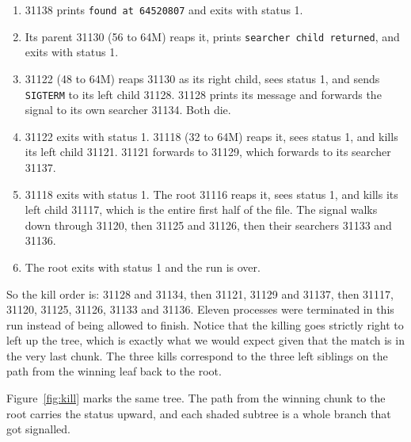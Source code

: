 \documentclass[11pt]{article}
\begin{document}
\begin{enumerate}
	\item 31138 prints \texttt{found at 64520807} and exits with status 1.
	\item Its parent 31130 (56 to 64M) reaps it, prints \texttt{searcher child
	returned}, and exits with status 1.
	\item 31122 (48 to 64M) reaps 31130 as its right child, sees status 1, and
	sends \texttt{SIGTERM} to its left child 31128. 31128 prints its message and
	forwards the signal to its own searcher 31134. Both die.
	\item 31122 exits with status 1. 31118 (32 to 64M) reaps it, sees status 1, and
	kills its left child 31121. 31121 forwards to 31129, which forwards to its
	searcher 31137.
	\item 31118 exits with status 1. The root 31116 reaps it, sees status 1, and
	kills its left child 31117, which is the entire first half of the file. The
	signal walks down through 31120, then 31125 and 31126, then their searchers
	31133 and 31136.
	\item The root exits with status 1 and the run is over.
\end{enumerate}

So the kill order is: 31128 and 31134, then 31121, 31129 and 31137, then 31117,
31120, 31125, 31126, 31133 and 31136. Eleven processes were terminated in this run
instead of being allowed to finish. Notice that the killing goes strictly right to
left up the tree, which is exactly what we would expect given that the match is in
the very last chunk. The three kills correspond to the three left siblings on the
path from the winning leaf back to the root.

Figure~\ref{fig:kill} marks the same tree. The path from the winning chunk to the
root carries the status upward, and each shaded subtree is a whole branch that got
signalled.
\end{document}
